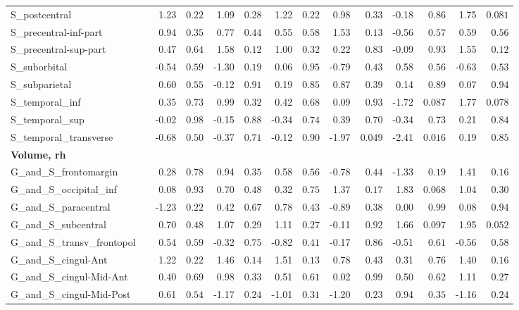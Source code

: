 {\begin{longtable}{llrrrrrrrrrrrr}
S\_postcentral &  & 1.23 & $0.22$ & 1.09 & $0.28$ & 1.22 & $0.22$ & 0.98 & $0.33$ & -0.18 & $0.86$ & 1.75 & $0.081$ \\
S\_precentral-inf-part &  & 0.94 & $0.35$ & 0.77 & $0.44$ & 0.55 & $0.58$ & 1.53 & $0.13$ & -0.56 & $0.57$ & 0.59 & $0.56$ \\
S\_precentral-sup-part &  & 0.47 & $0.64$ & 1.58 & $0.12$ & 1.00 & $0.32$ & 0.22 & $0.83$ & -0.09 & $0.93$ & 1.55 & $0.12$ \\
S\_suborbital &  & -0.54 & $0.59$ & -1.30 & $0.19$ & 0.06 & $0.95$ & -0.79 & $0.43$ & 0.58 & $0.56$ & -0.63 & $0.53$ \\
S\_subparietal &  & 0.60 & $0.55$ & -0.12 & $0.91$ & 0.19 & $0.85$ & 0.87 & $0.39$ & 0.14 & $0.89$ & 0.07 & $0.94$ \\
S\_temporal\_inf &  & 0.35 & $0.73$ & 0.99 & $0.32$ & 0.42 & $0.68$ & 0.09 & $0.93$ & -1.72 & $0.087$ & 1.77 & $0.078$ \\
S\_temporal\_sup &  & -0.02 & $0.98$ & -0.15 & $0.88$ & -0.34 & $0.74$ & 0.39 & $0.70$ & -0.34 & $0.73$ & 0.21 & $0.84$ \\
S\_temporal\_transverse &  & -0.68 & $0.50$ & -0.37 & $0.71$ & -0.12 & $0.90$ & -1.97 & $0.049$ & -2.41 & $0.016$ & 0.19 & $0.85$ \\
\midrule\multicolumn{14}{l}{\textbf{Volume, rh}} \\
G\_and\_S\_frontomargin &  & 0.28 & $0.78$ & 0.94 & $0.35$ & 0.58 & $0.56$ & -0.78 & $0.44$ & -1.33 & $0.19$ & 1.41 & $0.16$ \\
G\_and\_S\_occipital\_inf &  & 0.08 & $0.93$ & 0.70 & $0.48$ & 0.32 & $0.75$ & 1.37 & $0.17$ & 1.83 & $0.068$ & 1.04 & $0.30$ \\
G\_and\_S\_paracentral &  & -1.23 & $0.22$ & 0.42 & $0.67$ & 0.78 & $0.43$ & -0.89 & $0.38$ & 0.00 & $0.99$ & 0.08 & $0.94$ \\
G\_and\_S\_subcentral &  & 0.70 & $0.48$ & 1.07 & $0.29$ & 1.11 & $0.27$ & -0.11 & $0.92$ & 1.66 & $0.097$ & 1.95 & $0.052$ \\
G\_and\_S\_transv\_frontopol &  & 0.54 & $0.59$ & -0.32 & $0.75$ & -0.82 & $0.41$ & -0.17 & $0.86$ & -0.51 & $0.61$ & -0.56 & $0.58$ \\
G\_and\_S\_cingul-Ant &  & 1.22 & $0.22$ & 1.46 & $0.14$ & 1.51 & $0.13$ & 0.78 & $0.43$ & 0.31 & $0.76$ & 1.40 & $0.16$ \\
G\_and\_S\_cingul-Mid-Ant &  & 0.40 & $0.69$ & 0.98 & $0.33$ & 0.51 & $0.61$ & 0.02 & $0.99$ & 0.50 & $0.62$ & 1.11 & $0.27$ \\
G\_and\_S\_cingul-Mid-Post &  & 0.61 & $0.54$ & -1.17 & $0.24$ & -1.01 & $0.31$ & -1.20 & $0.23$ & 0.94 & $0.35$ & -1.16 & $0.24$ \\

\end{longtable}}
